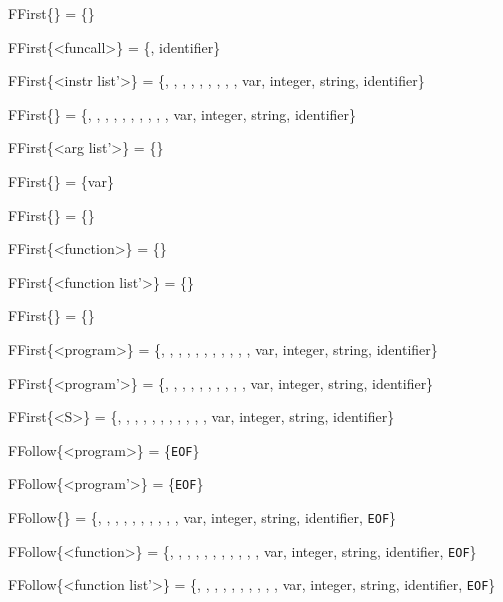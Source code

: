 FFirst\{<funcall args>\}    = \{\lit{(}\}

FFirst\{<funcall>\}         = \{\lit{\&}, identifier\}

FFirst\{<instr list'>\}     = \{, , , , \lit{(}, \lit{!}, \lit{+}, \lit{-}, \lit{\&}, var, integer, string, identifier\}

FFirst\{<instr list>\}      = \{\lit{\{}, , , , , \lit{(}, \lit{!}, \lit{+}, \lit{-}, \lit{\&}, var, integer, string, identifier\}

FFirst\{<arg list'>\}       = \{\lit{,}\}

FFirst\{<arg list>\}        = \{var\}

FFirst\{<function args>\}   = \{\lit{(}\}

FFirst\{<function>\}        = \{\}

FFirst\{<function list'>\}  = \{\}

FFirst\{<function list>\}   = \{\}

FFirst\{<program>\}         = \{, \lit{\{}, , , , , \lit{(}, \lit{!}, \lit{+}, \lit{-}, \lit{\&}, var, integer, string, identifier\}

FFirst\{<program'>\}        = \{\lit{\{}, , , , , \lit{(}, \lit{!}, \lit{+}, \lit{-}, \lit{\&}, var, integer, string, identifier\}

FFirst\{<S>\}               = \{, \lit{\{}, , , , , \lit{(}, \lit{!}, \lit{+}, \lit{-}, \lit{\&}, var, integer, string, identifier\}

FFollow\{<program>\}         = \{\texttt{EOF}\}

FFollow\{<program'>\}        = \{\texttt{EOF}\}

FFollow\{<function list>\}   = \{\lit{\{}, , , , , \lit{(}, \lit{!}, \lit{+}, \lit{-}, \lit{\&}, var, integer, string, identifier, \texttt{EOF}\}

FFollow\{<function>\}        = \{, \lit{\{}, , , , , \lit{(}, \lit{!}, \lit{+}, \lit{-}, \lit{\&}, var, integer, string, identifier, \texttt{EOF}\}

FFollow\{<function list'>\}  = \{\lit{\{}, , , , , \lit{(}, \lit{!}, \lit{+}, \lit{-}, \lit{\&}, var, integer, string, identifier, \texttt{EOF}\}


